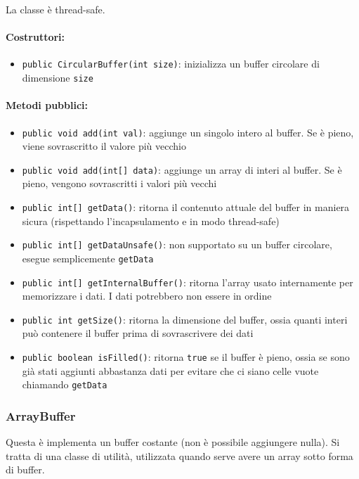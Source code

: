 La classe è thread-safe.

\paragraph{Costruttori:}\begin{itemize}
	\item \texttt{public CircularBuffer(int size)}: inizializza un buffer circolare di dimensione \texttt{size}
\end{itemize}

\paragraph{Metodi pubblici:}\begin{itemize}
	\item \texttt{public void add(int val)}: aggiunge un singolo intero al buffer. Se è pieno, viene sovrascritto il valore più vecchio
	\item \texttt{public void add(int[] data)}: aggiunge un array di interi al buffer. Se è pieno, vengono sovrascritti i valori più vecchi
	\item \texttt{public int[] getData()}: ritorna il contenuto attuale del buffer in maniera sicura (rispettando l'incapsulamento e in modo thread-safe)
	\item \texttt{public int[] getDataUnsafe()}: non supportato su un buffer circolare, esegue semplicemente \texttt{getData}
	\item \texttt{public int[] getInternalBuffer()}: ritorna l'array usato internamente per memorizzare i dati. I dati potrebbero non essere in ordine
	\item \texttt{public int getSize()}: ritorna la dimensione del buffer, ossia quanti interi può contenere il buffer prima di sovrascrivere dei dati
	\item \texttt{public boolean isFilled()}: ritorna \texttt{true} se il buffer è pieno, ossia se sono già stati aggiunti abbastanza dati per evitare che ci siano celle vuote chiamando \texttt{getData}
\end{itemize}

\subsubsection{ArrayBuffer}
Questa è implementa un buffer costante (non è possibile aggiungere nulla). Si tratta di una classe di utilità, utilizzata quando serve avere un array sotto forma di buffer.

